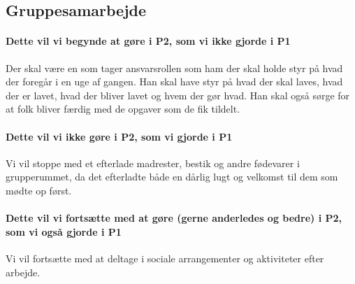 \subsection{Gruppesamarbejde}
\paragraph{Dette vil vi begynde at gøre i P2, som vi ikke gjorde i P1}
Der skal være en som tager ansvarsrollen som ham der skal holde styr på hvad der foregår i en uge af gangen. Han skal have styr på hvad der skal laves, hvad der er lavet, hvad der bliver lavet og hvem der gør hvad. Han skal også sørge for at folk bliver færdig med de opgaver som de fik tildelt.


\paragraph{Dette vil vi ikke gøre i P2, som vi gjorde i P1}
Vi vil stoppe med et efterlade madrester, bestik og andre fødevarer i grupperummet, da det efterladte både en dårlig lugt og velkomst til dem som mødte op først. 

\paragraph{Dette vil vi fortsætte med at gøre (gerne anderledes og bedre) i P2, som vi også gjorde i P1}
Vi vil fortsætte med at deltage i sociale arrangementer og aktiviteter efter arbejde. 